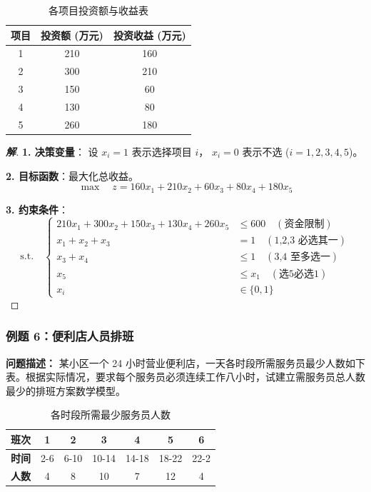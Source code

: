 \documentclass[a4paper,12pt]{ctexart} %
\newenvironment{solution}{\begin{proof}[\textbf{解}]}{\end{proof}}
\begin{document}
	\begin{table}[H]
		\centering
		\begin{tabular}{ccc}
			\toprule
			\textbf{项目} & \textbf{投资额 (万元)} & \textbf{投资收益 (万元)} \\
			\midrule
			1 & 210 & 160 \\
			2 & 300 & 210 \\
			3 & 150 & 60 \\
			4 & 130 & 80 \\
			5 & 260 & 180 \\
			\bottomrule
		\end{tabular}
		\caption{各项目投资额与收益表}
	\end{table}
	
	\begin{solution}
		\textbf{1. 决策变量}：
		设 $x_i = 1$ 表示选择项目 $i$， $x_i = 0$ 表示不选 ($i=1,2,3,4,5$)。
		
		\textbf{2. 目标函数}：最大化总收益。
		$$ \max \quad z = 160x_1 + 210x_2 + 60x_3 + 80x_4 + 180x_5 $$
		
		\textbf{3. 约束条件}：
		\begin{equation}
			\text{s.t.} \quad \left\{
			\begin{aligned}
				210x_1 + 300x_2 + 150x_3 + 130x_4 + 260x_5 & \le 600 \quad (\text{资金限制}) \\
				x_1 + x_2 + x_3 &= 1 \quad (\text{1,2,3 必选其一}) \\
				x_3 + x_4 &\le 1 \quad (\text{3,4 至多选一}) \\
				x_5 &\le x_1 \quad (\text{选5必选1}) \\
				x_i &\in \{0, 1\}
			\end{aligned}
			\right.
		\end{equation}
	\end{solution}
	
	\subsubsection{例题 6：便利店人员排班}
	
	\textbf{问题描述：}
	某小区一个 24 小时营业便利店，一天各时段所需服务员最少人数如下表。根据实际情况，要求每个服务员必须连续工作八小时，试建立需服务员总人数最少的排班方案数学模型。
	
	\begin{table}[H]
		\centering
		\begin{tabular}{ccccccc}
			\toprule
			\textbf{班次} & \textbf{1} & \textbf{2} & \textbf{3} & \textbf{4} & \textbf{5} & \textbf{6} \\
			\midrule
			\textbf{时间} & 2-6 & 6-10 & 10-14 & 14-18 & 18-22 & 22-2 \\
			\textbf{人数} & 4 & 8 & 10 & 7 & 12 & 4 \\
			\bottomrule
		\end{tabular}
		\caption{各时段所需最少服务员人数}
	\end{table}
	
\end{document}

